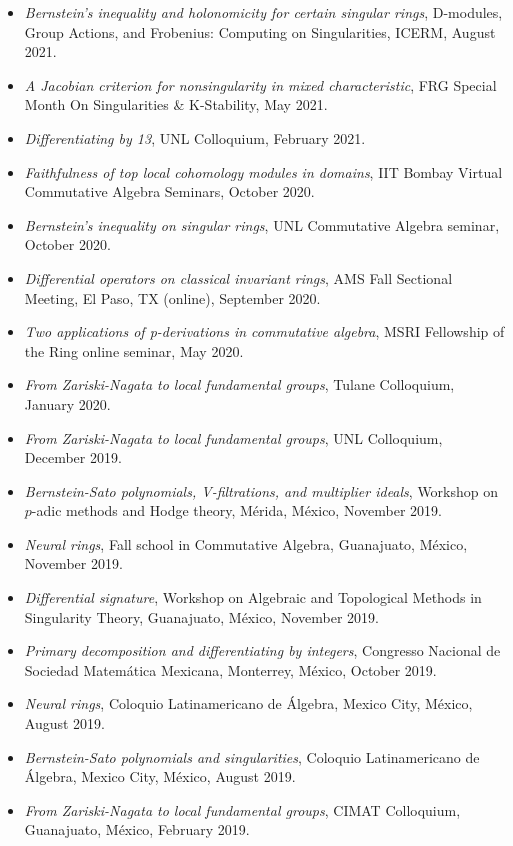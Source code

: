 \documentclass[12pt]{amsart}
\begin{document}
\begin{itemize}[leftmargin=9mm]
\item \emph{Bernstein's inequality and holonomicity for certain singular rings},  D-modules, Group Actions, and Frobenius: Computing on Singularities, ICERM, August 2021. 
\item \emph{A Jacobian criterion for nonsingularity in mixed characteristic}, FRG Special Month On Singularities \& K-Stability, May 2021.
\item \emph{Differentiating by 13}, UNL Colloquium, February 2021.
	\item \emph{Faithfulness of top local cohomology modules in domains}, IIT Bombay Virtual Commutative Algebra Seminars,  October 2020.
	\item \emph{Bernstein's inequality on singular rings}, UNL Commutative Algebra seminar, October 2020.
	\item \emph{Differential operators on classical invariant rings}, AMS Fall Sectional Meeting, El Paso, TX (online), September 2020.
	\item \emph{Two applications of p-derivations in commutative algebra}, MSRI Fellowship of the Ring online seminar, May 2020.
	\item \emph{From Zariski-Nagata to local fundamental groups}, Tulane Colloquium, January 2020.
	\item \emph{From Zariski-Nagata to local fundamental groups}, UNL Colloquium, December 2019.
	\item \emph{Bernstein-Sato polynomials, V-filtrations, and multiplier ideals}, Workshop on $p$-adic methods and Hodge theory, M\'erida, M\'exico, November 2019.
\item \emph{Neural rings}, Fall school in Commutative Algebra, Guanajuato, M\'exico, November 2019.
\item \emph{Differential signature}, Workshop on Algebraic and Topological Methods in Singularity Theory, Guanajuato, M\'exico, November 2019.
	\item \emph{Primary decomposition and differentiating by integers}, Congresso Nacional de Sociedad Matem\'atica Mexicana, Monterrey, M\'exico, October 2019.
		\item \emph{Neural rings}, Coloquio Latinamericano de \'Algebra, Mexico City, M\'exico, August 2019.
	\item \emph{Bernstein-Sato polynomials and singularities}, Coloquio Latinamericano de \'Algebra, Mexico City, M\'exico, August 2019.
		\item \emph{From Zariski-Nagata to local fundamental groups}, CIMAT Colloquium, Guanajuato, M\'exico, February 2019.

\end{itemize}
\end{document}
